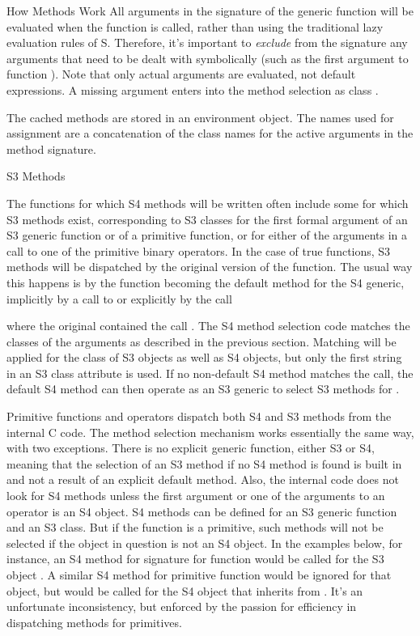 \begin{Section}{How Methods Work}
All arguments in the signature of the generic function will be evaluated when the
function is called, rather than using the traditional lazy
evaluation rules of S.  Therefore, it's important to \emph{exclude}
from the signature any arguments that need to be dealt with
symbolically (such as the first argument to function
).  Note that only actual arguments are
evaluated, not default expressions.
A missing argument enters into the method selection as class
.

The cached methods are stored in an
environment object.  The names used for assignment are a
concatenation of the class names for the active arguments in the method signature.

\end{Section}
%
\begin{Section}{S3 Methods}

The functions for which S4 methods will be written often include some
for which S3 methods exist, corresponding to S3 classes for the first
formal argument of an S3 generic function or of a primitive function, or for either of the
arguments in a call to one of the primitive binary operators.
In the case of true functions, S3 methods will be dispatched
by the original version of the function.  The usual
way this happens is by the function becoming the default
method for the S4 generic, implicitly by a call to
 or explicitly by the call


where the original  contained the call
.
The S4 method selection code matches the classes of the arguments as
described in the previous section.
Matching will be applied for the class of S3 objects as well as S4
objects, but only the first string in an S3 class attribute is used.
If no non-default S4 method
matches the call,  the default S4 method can then operate as an S3
generic to select S3 methods for .

Primitive functions and operators dispatch both S4 and S3 methods from
the internal C code.
The method selection mechanism works essentially the same way, with
two exceptions.
There is no explicit generic function, either S3 or S4, meaning that
the selection of an S3 method if no S4 method is found is built in and
not a result of an explicit default method.
Also, the internal code does not look for S4 methods unless the first
argument or one of the arguments to an operator is an S4 object.
S4 methods can be defined for an S3 generic function and an S3 class.
But if the function is a primitive, such methods will not be selected
if the object in question is not an S4 object.
In the examples below, for instance,  an S4 method for signature
 for function  would be called for the
S3 object .
A similar S4 method for primitive function
\code{`[`} would be ignored for that object, but would be called for
the S4 object  that inherits from .
It's an unfortunate inconsistency, but enforced by the passion for
efficiency in dispatching methods for primitives.



\end{Section}
